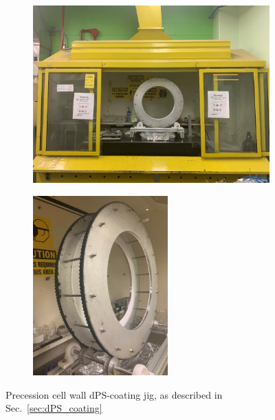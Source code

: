 \begin{figure}
\centering
\begin{subfigure}{.5\textwidth} 
  \centering
  \includegraphics[width=\textwidth]{figures/dPS_jig_and_fume_hood.jpg}
\end{subfigure}%
\begin{subfigure}{.5\textwidth}
  \centering
  \includegraphics[width=0.57\textwidth]{figures/dPS_jig.jpg}
\end{subfigure}
\caption
{Precession cell wall dPS-coating jig, as described in Sec.~\ref{sec:dPS_coating}}
\label{fig:dPS_coating_jig}
\end{figure}

